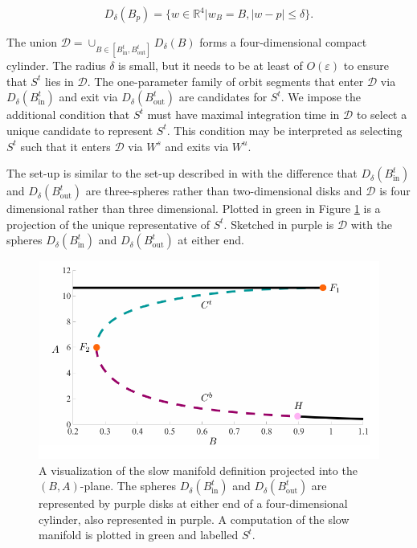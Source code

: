 \documentclass{ws-ijbc}
\begin{document}
\begin{equation*}
D_\delta(B_p)=\{w \in \mathbb{R}^4 | w_B = B, |w-p| \leq \delta\}.
\end{equation*}
    
\noindent
The union $\mathscr{D} = \cup_{B \in [B^t_{\mathrm{in}}, B^t_{\mathrm{out}}]} D_\delta(B)$ forms a four-dimensional compact cylinder.  The radius $\delta$ is small, but it needs to be at least of $O(\varepsilon)$ to ensure that $S^t$ lies in $\mathscr{D}$.  The one-parameter family of orbit segments that enter $\mathscr{D}$ via $D_\delta(B^t_{\mathrm{in}})$ and exit via $D_\delta(B^t_{\mathrm{out}})$ are candidates for $S^t$.   We impose the additional condition that $S^t$ must have maximal integration time in $\mathscr{D}$ to select a unique candidate to represent $S^t$.  This condition may be interpreted as selecting $S^t$ such that it enters $\mathscr{D}$ via $W^s$ and exits via $W^u$.
    
The set-up is similar to the set-up described in \cite{Saeed_Paper} with the difference that $D_\delta(B^t_{\mathrm{in}})$ and $D_\delta(B^t_{\mathrm{out}})$ are three-spheres rather than two-dimensional disks and $\mathscr{D}$ is four dimensional rather than three dimensional.  Plotted in green in Figure \ref{tube_figure} is a projection of the unique representative of $S^t$.  Sketched in purple is $\mathscr{D}$ with the spheres $D_\delta(B^t_{\mathrm{in}})$ and $D_\delta(B^t_{\mathrm{out}})$ at either end.

\begin{figure}[!t]
\begin{center}
\includegraphics[page=2]{figures.pdf}
\end{center}
\caption{A visualization of the slow manifold definition projected into the $(B,A)$-plane.  The spheres $D_\delta(B^t_{\mathrm{in}})$ and $D_\delta(B^t_{\mathrm{out}})$ are represented by purple disks at either end of a four-dimensional cylinder, also represented in purple.  A computation of the slow manifold is plotted in green and labelled $S^t$.}
\label{tube_figure}
\end{figure}
\end{document}
